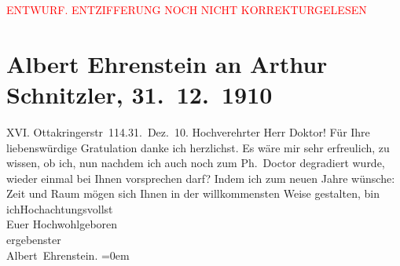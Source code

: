 
\begin{center}
            \textcolor{red}{ENTWURF. ENTZIFFERUNG NOCH NICHT KORREKTURGELESEN}
                      \end{center}
            
               \section[Albert Ehrenstein an Arthur Schnitzler, 31. 12. 1910]{ Albert Ehrenstein an Arthur Schnitzler, 31. 12. 1910}\nopagebreak{}\rehead{ }\begin{ledgroupsized}[t]{13cm}\normalsize\beginnumbering{} \toendnotes[C]{\smallbreak\pagebreak[2]} 
\pstart
           {\pb}XVI. Ottakringerstr 114.\hfill 31. Dez. 10.\pend
           \pstart\center{}Hochverehrter Herr Doktor!\pend\pstart
           Für Ihre liebenswürdige Gratulation danke ich herzlichst.\pend
           \pstart
           Es wäre mir sehr erfreulich, zu wissen, ob ich, nun nachdem ich auch noch zum
                    Ph. Doctor degradiert wurde, wieder einmal bei Ihnen vorsprechen darf?\pend
           \pstart
           Indem ich zum neuen Jahre wünsche: Zeit und Raum mögen sich Ihnen in der
                    willkommensten Weise gestalten,\pend
           \pstart
           bin ich\hspace*{2em}Hochachtungsvollst{\\[\baselineskip]}Euer Hochwohlgeboren{\\[\baselineskip]}ergebenster{\\[\baselineskip]}\spacefill\mbox{Albert Ehrenstein.}\pend
           \leftskip=0em{}\endnumbering{}\end{ledgroupsized}  \newcommand{\dateiname}{L01997}\newcommand{\titel}{Albert Ehrenstein an Arthur Schnitzler, 31. 12. 1910}\newcommand{\editorInnen}{Martin Anton Müller und Gerd-Hermann Susen}
      